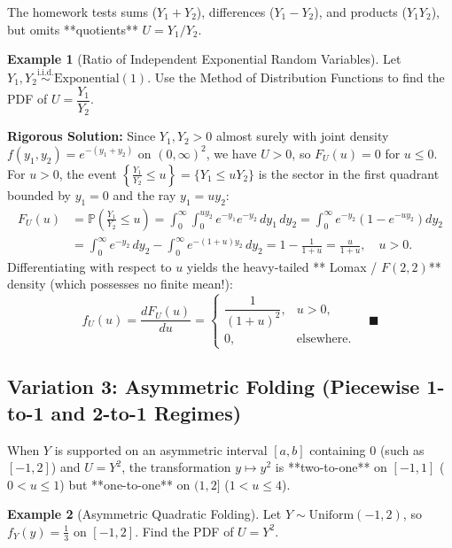\documentclass[11pt, letterpaper]{article}
\theoremstyle{definition}
\newtheorem{example}{Example}[section]
\theoremstyle{remark}
\newcommand{\Prob}{\mathbb{P}}
\begin{document}
The homework tests sums ($Y_1 + Y_2$), differences ($Y_1 - Y_2$), and products ($Y_1 Y_2$), but omits **quotients** $U = Y_1 / Y_2$.

\begin{example}[Ratio of Independent Exponential Random Variables]
Let $Y_1, Y_2 \stackrel{\text{i.i.d.}}{\sim} \text{Exponential}(1)$. Use the Method of Distribution Functions to find the PDF of $U = \dfrac{Y_1}{Y_2}$.
\end{example}

\textbf{Rigorous Solution:}
Since $Y_1, Y_2 > 0$ almost surely with joint density $f(y_1, y_2) = e^{-(y_1 + y_2)}$ on $(0, \infty)^2$, we have $U > 0$, so $F_U(u) = 0$ for $u \le 0$. For $u > 0$, the event $\left\{\frac{Y_1}{Y_2} \le u\right\} = \{Y_1 \le u Y_2\}$ is the sector in the first quadrant bounded by $y_1 = 0$ and the ray $y_1 = u y_2$:
\begin{align*}
    F_U(u) &= \Prob\left(\frac{Y_1}{Y_2} \le u\right) = \int_{0}^{\infty} \int_{0}^{u y_2} e^{-y_1} e^{-y_2}\,dy_1\,dy_2 = \int_{0}^{\infty} e^{-y_2}\left(1 - e^{-u y_2}\right) dy_2 \\
    &= \int_{0}^{\infty} e^{-y_2}\,dy_2 - \int_{0}^{\infty} e^{-(1 + u)y_2}\,dy_2 = 1 - \frac{1}{1 + u} = \frac{u}{1 + u}, \quad u > 0.
\end{align*}
Differentiating with respect to $u$ yields the heavy-tailed ** Lomax / $F(2,2)$** density (which possesses no finite mean!):
\[
    f_U(u) = \frac{dF_U(u)}{du} = \begin{cases} \dfrac{1}{(1 + u)^2}, & u > 0, \\[6pt] 0, & \text{elsewhere.} \end{cases} \quad \blacksquare
\]

\subsection{Variation 3: Asymmetric Folding (Piecewise 1-to-1 and 2-to-1 Regimes)}

When $Y$ is supported on an asymmetric interval $[a, b]$ containing $0$ (such as $[-1, 2]$) and $U = Y^2$, the transformation $y \mapsto y^2$ is **two-to-one** on $[-1, 1]$ ($0 < u \le 1$) but **one-to-one** on $(1, 2]$ ($1 < u \le 4$).

\begin{example}[Asymmetric Quadratic Folding]
Let $Y \sim \text{Uniform}(-1, 2)$, so $f_Y(y) = \frac{1}{3}$ on $[-1, 2]$. Find the PDF of $U = Y^2$.
\end{example}
\end{document}
